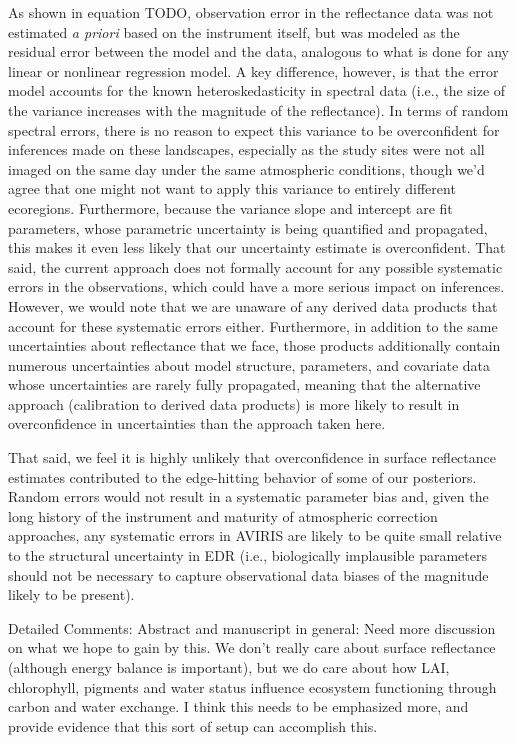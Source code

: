 As shown in equation TODO, observation error in the reflectance data was not estimated \emph{a priori} based on the instrument itself, but was modeled as the residual error between the model and the data, analogous to what is done for any linear or nonlinear regression model.
A key difference, however, is that the error model accounts for the known heteroskedasticity in spectral data (i.e., the size of the variance increases with the magnitude of the reflectance).
In terms of random spectral errors, there is no reason to expect this variance to be overconfident for inferences made on these landscapes, especially as the study sites were not all imaged on the same day under the same atmospheric conditions, though we’d agree that one might not want to apply this variance to entirely different ecoregions.
Furthermore, because the variance slope and intercept are fit parameters, whose parametric uncertainty is being quantified and propagated, this makes it even less likely that our uncertainty estimate is overconfident.
That said, the current approach does not formally account for any possible systematic errors in the observations, which could have a more serious impact on inferences.
However, we would note that we are unaware of any derived data products that account for these systematic errors either.
Furthermore, in addition to the same uncertainties about reflectance that we face, those products additionally contain numerous uncertainties about model structure, parameters, and covariate data whose uncertainties are rarely fully propagated, meaning that the alternative approach (calibration to derived data products) is more likely to result in overconfidence in uncertainties than the approach taken here.

That said, we feel it is highly unlikely that overconfidence in surface reflectance estimates contributed to the edge-hitting behavior of some of our posteriors.
Random errors would not result in a systematic parameter bias and, given the long history of the instrument and maturity of atmospheric correction approaches, any systematic errors in AVIRIS are likely to be quite small relative to the structural uncertainty in EDR (i.e., biologically implausible parameters should not be necessary to capture observational data biases of the magnitude likely to be present).

\begin{reviewer}
  Detailed Comments:
  Abstract and manuscript in general: Need more discussion on what we hope to gain by this. We don’t really care about surface reflectance (although energy balance is important), but we do care about how LAI, chlorophyll, pigments and water status influence ecosystem functioning through carbon and water exchange. I think this needs to be emphasized more, and provide evidence that this sort of setup can accomplish this.
\end{reviewer}

